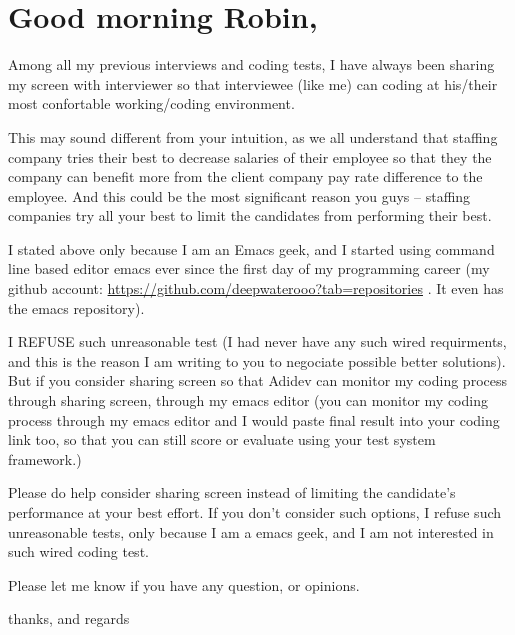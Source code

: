 \documentclass[9pt, b5paper]{article}
\begin{document}
\section{Good morning Robin,}
\label{sec-20}

Among all my previous interviews and coding tests, I have always been sharing my screen with interviewer so that interviewee (like me) can coding at his/their most confortable working/coding environment. 

This may sound different from your intuition, as we all understand that staffing company tries their best to decrease salaries of their employee so that they the company can benefit more from the client company pay rate difference to the employee. And this could be the most significant reason you guys -- staffing companies try all your best to limit the candidates from performing their best. 

I stated above only because I am an Emacs geek, and I started using command line based editor emacs ever since the first day of my programming career (my github account: \url{https://github.com/deepwaterooo?tab=repositories} . It even has the emacs repository). 

I REFUSE such unreasonable test (I had never have any such wired requirments, and this is the reason I am writing to you to negociate possible better solutions). But if you consider sharing screen so that Adidev can monitor my coding process through sharing screen, through my emacs editor (you can monitor my coding process through my emacs editor and I would paste final result into your coding link too, so that you can still score or evaluate using your test system framework.)

Please do help consider sharing screen instead of limiting the candidate's performance at your best effort. If you don't consider such options, I refuse such unreasonable tests, only because I am a emacs geek, and I am not interested in such wired coding test. 

Please let me know if you have any question, or opinions. 

thanks, and regards 
\end{document}
